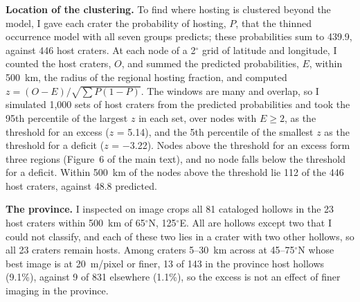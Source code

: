 \documentclass{planetary}
\begin{document}
\textbf{Location of the clustering.} To find where hosting is clustered beyond the model, I gave each crater the probability of hosting, $P$, that the thinned occurrence model with all seven groups predicts; these probabilities sum to 439.9, against 446 host craters. At each node of a 2$^\circ$ grid of latitude and longitude, I counted the host craters, $O$, and summed the predicted probabilities, $E$, within 500~km, the radius of the regional hosting fraction, and computed $z = (O - E)/\sqrt{\sum P(1 - P)}$. The windows are many and overlap, so I simulated 1,000 sets of host craters from the predicted probabilities and took the 95th percentile of the largest $z$ in each set, over nodes with $E \geq 2$, as the threshold for an excess ($z$ = 5.14), and the 5th percentile of the smallest $z$ as the threshold for a deficit ($z$ = $-$3.22). Nodes above the threshold for an excess form three regions (Figure~6 of the main text), and no node falls below the threshold for a deficit. Within 500~km of the nodes above the threshold lie 112 of the 446 host craters, against 48.8 predicted.

\textbf{The province.} I inspected on image crops all 81 cataloged hollows in the 23 host craters within 500~km of 65$^\circ$N, 125$^\circ$E. All are hollows except two that I could not classify, and each of these two lies in a crater with two other hollows, so all 23 craters remain hosts. Among craters 5--30~km across at 45--75$^\circ$N whose best image is at 20~m/pixel or finer, 13 of 143 in the province host hollows (9.1\%), against 9 of 831 elsewhere (1.1\%), so the excess is not an effect of finer imaging in the province.
\end{document}

